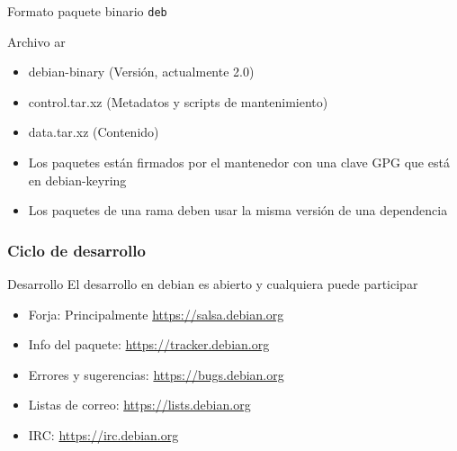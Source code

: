 \documentclass{beamer}
\begin{document}
\begin{frame}{Formato paquete binario \texttt{deb}}
  \begin{block}{Archivo ar}
    \begin{itemize}
    \item debian-binary (Versión, actualmente 2.0)
    \item control.tar.xz (Metadatos y scripts de mantenimiento)
    \item data.tar.xz (Contenido)
    \end{itemize}
  \end{block}
  \begin{itemize}
  \item Los paquetes están firmados por el mantenedor con una clave
    GPG que está en debian-keyring
  \item Los paquetes de una rama deben usar la misma versión de una
    dependencia
  \end{itemize}
\end{frame}

\begin{frame}\frametitle{Ciclo de desarrollo}
  \begin{block}{Desarrollo}
  El desarrollo en debian es abierto y cualquiera puede participar
  \end{block}  
\begin{itemize}
\item Forja: Principalmente \url{https://salsa.debian.org}
\item Info del paquete: \url{https://tracker.debian.org}
\item Errores y sugerencias: \url{https://bugs.debian.org}
\item Listas de correo: \url{https://lists.debian.org}
\item IRC: \url{https://irc.debian.org}
\end{itemize}
\end{frame}
\end{document}
